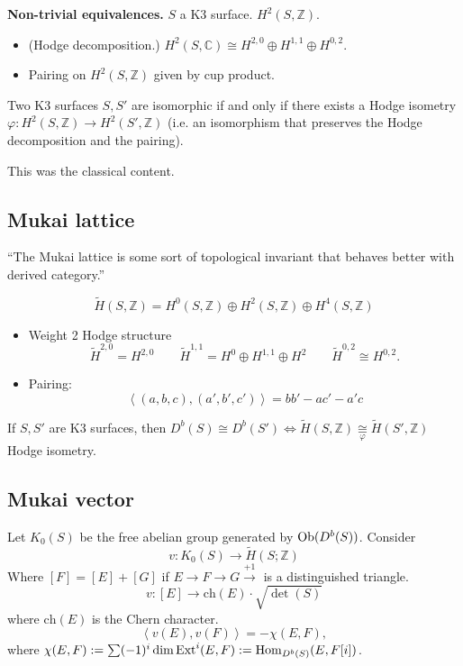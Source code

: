 \medskip\noindent
{\bf Non-trivial equivalences.} $S$ a K3 surface. $H^{2}(S,\mathbb{Z})$.
\begin{itemize}
\item (Hodge decomposition.) 
$H^{2}(S,\mathbb{C})\cong H^{2,0} \oplus H^{1,1} \oplus H^{0,2}$.
\item Pairing on $H^{2}(S,\mathbb{Z})$ given by cup product.
\end{itemize}

\begin{theorem}
\label{theorem-Torelli-for-K3}
Two K3 surfaces $S,S'$ are isomorphic if and only if there exists a Hodge
isometry $\varphi:H^{2}(S,\mathbb{Z})\to H^{2}(S',\mathbb{Z})$ 
(i.e. an isomorphism that preserves the Hodge decomposition and the pairing).
\end{theorem}

This was the classical content.

\subsection{Mukai lattice}
\label{subsection-Mukai-lattice}

``The Mukai lattice is some sort of topological invariant that behaves better 
with derived category.''

$$
\tilde{H}(S,\mathbb{Z})
=H^{0}(S,\mathbb{Z})\oplus H^{2}(S,\mathbb{Z})\oplus H^{4}(S,\mathbb{Z})
$$
\begin{itemize}
\item Weight 2 Hodge structure
$$
\tilde{H}^{2,0}=H^{2,0}\qquad \tilde{H}^{1,1}=H^0\oplus H^{1,1}\oplus H^2
\qquad \tilde{H}^{0,2}\cong H^{0,2}.
$$
\item Pairing:
$$
\left<(a,b,c),(a',b',c')\right>=bb'-ac'-a'c
$$
\end{itemize}

\begin{theorem}
\label{theorem-Mukai-Orlov}
If $S,S'$ are K3 surfaces, then $D^b(S) \cong D^b(S')\iff
\tilde{H}(S,\mathbb{Z})\underset{\varphi}{\cong}\tilde{H}(S',\mathbb{Z})$ Hodge
isometry.
\end{theorem}

\subsection{Mukai vector}
\label{subsection-Mukai-vector}

Let $K_0(S)$ be the free abelian group generated by $\mathop{\mathrm{Ob}}\nolimits(D^b(S))$. Consider
$$
v:K_0(S)\to \tilde{H}(S;\mathbb{Z})
$$
Where $[F]=[E]+[G]$ if $E \to F \to G \xrightarrow{+1}$ is a distinguished
triangle.
$$
v:[E] \to \text{ch}(E)\cdot \sqrt{\det(S)}
$$
where $\text{ch}(E)$ is the Chern character.
$$
\left<v(E),v(F)\right>=-\chi(E,F),
$$
where $\chi(E,F):=\sum(-1)^i\dim\text{Ext}^i(E,F):=\mathop{\mathrm{Hom}}\nolimits_{D^b(S)}(E,F[i])$.

